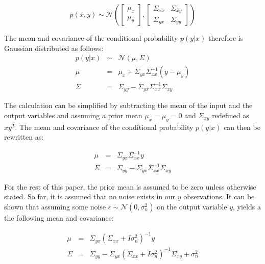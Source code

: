 \documentclass[useAMS,usenatbib,fleqn]{mn2e}
\begin{document}
\begin{equation}
p\left ( x,y\right) \sim \mathcal{N} \left ( \begin{bmatrix}\mu_{x}\\\mu_{y} \end{bmatrix}, \begin{bmatrix}\Sigma_{xx} & \Sigma_{xy}\\\Sigma_{yx} & \Sigma_{yy} \end{bmatrix}\right )
\end{equation}

The mean and covariance of the conditional probability $p(y|x)$ therefore is Gaussian distributed as follows:
\begin{equation}
\begin{array}{rcl}
p(y|x)		&	\sim		&	\mathcal{N} \left ( \mu, \Sigma \right )\\
\mu			&	=		&	\mu_{x}+\Sigma_{yx}\Sigma_{xx}^{-1}\left ( y-\mu_{y}\right )\\
\Sigma		&	=		&	\Sigma_{yy}-\Sigma_{yx}\Sigma_{xx}^{-1}\Sigma_{xy}
\end{array}
\end{equation}

The calculation can be simplified by subtracting the mean of the input and the output variables and assuming a prior mean $\mu_{x}=\mu_{y}=0$ and $\Sigma_{xy}$ redefined as $xy^{T}$. The mean and covariance of the conditional probability $p(y|x)$ can then be rewritten as:

\begin{equation}
\label{eq-conditional-zero-mean}
\begin{array}{rcl}
\mu 		&=&		\Sigma_{yx}\Sigma_{xx}^{-1}y\\
\Sigma 	&=& 	\Sigma_{yy}-\Sigma_{yx}\Sigma_{xx}^{-1}\Sigma_{xy}
\end{array}
\end{equation}

For the rest of this paper, the prior mean is assumed to be zero unless otherwise stated. So far, it is assumed that no noise exists in our $y$ observations. It can be shown that assuming some noise $\epsilon \sim \mathcal{N}\left(0,\sigma_{n}^{2}\right)$ on the output variable $y$, yields a the following mean and covariance:

\begin{equation}
\label{eq-mean-variance-noise}
\begin{array}{rcl}
\mu &=& \Sigma_{yx}\left(\Sigma_{xx}+I\sigma_{n}^{2}\right)^{-1}y\\
\Sigma &=& \Sigma_{yy}-\Sigma_{yx}\left(\Sigma_{xx}+I\sigma_{n}^{2}\right)^{-1}\Sigma_{xy}+\sigma_{n}^{2}
\end{array}
\end{equation}
\end{document}
